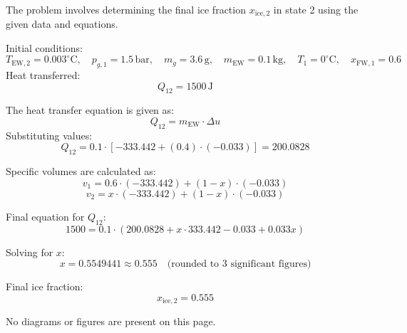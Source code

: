 The problem involves determining the final ice fraction \( x_{\text{ice},2} \) in state 2 using the given data and equations.  

Initial conditions:  
\[
T_{\text{EW},2} = 0.003^\circ\text{C}, \quad p_{g,1} = 1.5 \, \text{bar}, \quad m_g = 3.6 \, \text{g}, \quad m_{\text{EW}} = 0.1 \, \text{kg}, \quad T_1 = 0^\circ\text{C}, \quad x_{\text{FW},1} = 0.6
\]  
Heat transferred:  
\[
Q_{12} = 1500 \, \text{J}
\]  

The heat transfer equation is given as:  
\[
Q_{12} = m_{\text{EW}} \cdot \Delta u
\]  
Substituting values:  
\[
Q_{12} = 0.1 \cdot \left[ -333.442 + (0.4) \cdot (-0.033) \right] = 200.0828
\]  

Specific volumes are calculated as:  
\[
v_1 = 0.6 \cdot (-333.442) + (1 - x) \cdot (-0.033)
\]  
\[
v_2 = x \cdot (-333.442) + (1 - x) \cdot (-0.033)
\]  

Final equation for \( Q_{12} \):  
\[
1500 = 0.1 \cdot \left( 200.0828 + x \cdot 333.442 - 0.033 + 0.033x \right)
\]  

Solving for \( x \):  
\[
x = 0.5549441 \approx 0.555 \quad \text{(rounded to 3 significant figures)}
\]  

Final ice fraction:  
\[
x_{\text{ice},2} = 0.555
\]  

No diagrams or figures are present on this page.